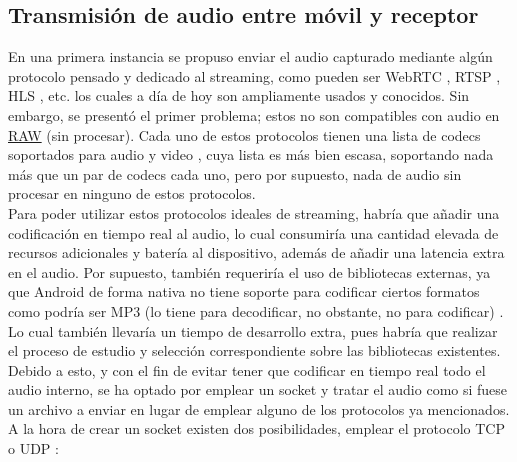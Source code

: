 \subsection{Transmisión de audio entre móvil y receptor}

En una primera instancia se propuso enviar el audio capturado mediante algún
protocolo pensado y dedicado al streaming, como pueden ser WebRTC
\cite{protocolo-webrtc}, RTSP \cite{protocolo-rtsp}, HLS \cite{protocolo-hls},
etc. los cuales a día de hoy son ampliamente usados y conocidos. Sin embargo, se
presentó el primer problema; estos no son compatibles con audio en
\href{https://en.wikipedia.org/wiki/Raw_audio_format}{RAW} (sin procesar). Cada
uno de estos protocolos tienen una lista de codecs soportados para audio y
video \cite{protocolo-codecs}, cuya lista es más bien escasa, soportando nada más que un par de codecs
cada uno, pero por supuesto, nada de audio sin procesar en ninguno de estos
protocolos.\\

Para poder utilizar estos protocolos ideales de streaming, habría que añadir una
codificación en tiempo real al audio, lo cual consumiría una cantidad elevada de
recursos adicionales y batería al dispositivo, además de añadir una latencia
extra en el audio. Por supuesto, también requeriría el uso de bibliotecas
externas, ya que Android de forma nativa no tiene soporte para codificar ciertos
formatos como podría ser MP3 (lo tiene para decodificar, no obstante, no para
codificar) \cite{android-mp3}. Lo cual también llevaría un tiempo de desarrollo extra, pues habría
que realizar el proceso de estudio y selección correspondiente sobre las
bibliotecas existentes.\\

Debido a esto, y con el fin de evitar tener que codificar en tiempo real todo el
audio interno, se ha optado por emplear un socket \cite{protocolo-socket} y tratar el audio como si
fuese un archivo a enviar en lugar de emplear alguno de los protocolos ya
mencionados.\\

A la hora de crear un socket \cite{protocolo-socket} existen dos posibilidades,
emplear el protocolo TCP \cite{protocolo-tcp} o UDP \cite{protocolo-udp}:


